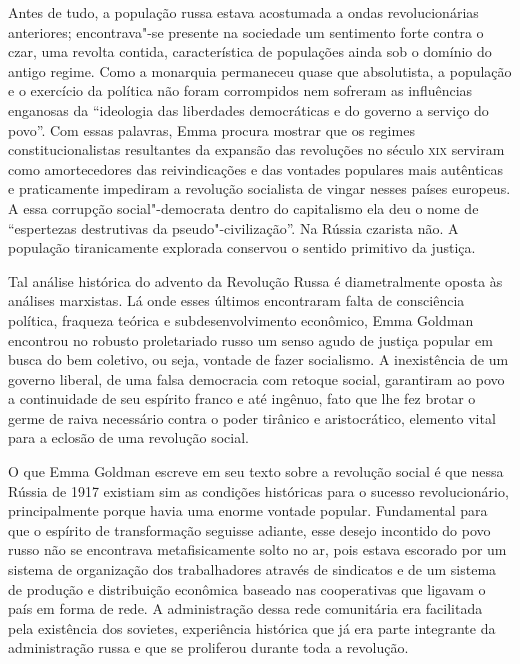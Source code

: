 Antes de tudo, a população russa estava acostumada a ondas
revolucionárias anteriores; encontrava"-se presente na sociedade um
sentimento forte contra o czar, uma revolta contida, característica de
populações ainda sob o domínio do antigo regime. Como a monarquia
permaneceu quase que absolutista, a população e o exercício da política
não foram corrompidos nem sofreram as influências enganosas da
“ideologia das liberdades democráticas e do governo a serviço do povo”.
Com essas palavras, Emma procura mostrar que os regimes
constitucionalistas resultantes da expansão das revoluções no século
\textsc{xix} serviram como amortecedores das reivindicações e das vontades
populares mais autênticas e praticamente impediram a revolução
socialista de vingar nesses países europeus. A essa corrupção
social"-democrata dentro do capitalismo ela deu o nome de “espertezas
destrutivas da pseudo"-civilização”. Na Rússia czarista não. A
população tiranicamente explorada conservou o sentido primitivo da
justiça.

Tal análise histórica do advento da Revolução Russa é
diametralmente oposta às análises marxistas. Lá onde esses últimos
encontraram falta de consciência política, fraqueza teórica e
subdesenvolvimento econômico, Emma Goldman encontrou no robusto
proletariado russo um senso agudo de justiça popular em busca do bem
coletivo, ou seja, vontade de fazer socialismo. A inexistência de um
governo liberal, de uma falsa democracia com retoque social, garantiram
ao povo a continuidade de seu espírito franco e até ingênuo, fato que
lhe fez brotar o germe de raiva necessário contra o poder tirânico e
aristocrático, elemento vital para a eclosão de uma revolução social. 

O que Emma Goldman escreve em seu texto sobre a revolução social é que
nessa Rússia de 1917 existiam sim as condições históricas para o
sucesso revolucionário, principalmente porque havia uma enorme vontade
popular. Fundamental para que o espírito de transformação seguisse
adiante, esse desejo incontido do povo russo não se encontrava
metafisicamente solto no ar, pois estava escorado por um sistema de
organização dos trabalhadores através de sindicatos e de um sistema de
produção e distribuição econômica baseado nas cooperativas que ligavam
o país em forma de rede. A administração dessa rede comunitária
era facilitada pela existência dos sovietes, experiência
histórica que já era parte integrante da administração russa e que se
proliferou durante toda a revolução.

